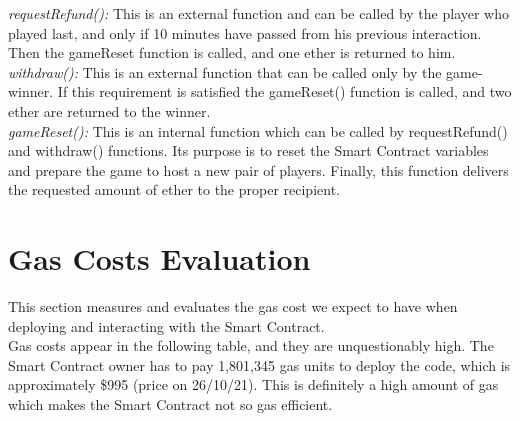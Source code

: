 \documentclass[12pt,a4paper]{article}
\begin{document}
\emph{requestRefund():} This is an external function and can be called by the player who played last, and only if 10 minutes
have passed from his previous interaction. Then the gameReset function is called, and one ether is returned to him.\\

\emph{withdraw():} This is an external function that can be called only by the game-winner. If this requirement is 
satisfied the gameReset() function is called, and two ether are returned to the winner.\\

\emph{gameReset():} This is an internal function which can be called by requestRefund() and withdraw() functions.
Its purpose is to reset the Smart Contract variables and prepare the game to host a new pair of players. Finally, this 
function delivers the requested amount of ether to the proper recipient.\\

\section*{Gas Costs Evaluation}
This section measures and evaluates the gas cost we expect to have when deploying and
interacting with the Smart Contract. \\

Gas costs appear in the following table, and they are unquestionably high.
The Smart Contract owner has to pay 1,801,345 gas units to deploy the code, which is
approximately \$995 (price on 26/10/21). This is definitely a high amount of gas which makes the
Smart Contract not so gas efficient. \\
\end{document}
